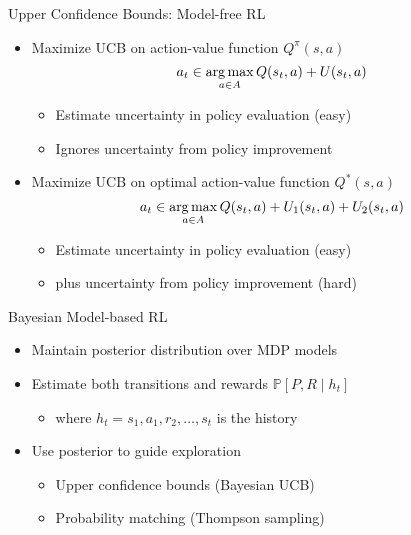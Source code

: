 \documentclass[aspectratio=169]{../latex_main/tntbeamer}  %
\begin{document}
\begin{frame}[c]{Upper Confidence Bounds: Model-free RL}
	
	\begin{itemize}
		\item Maximize UCB on action-value function $Q^\pi(s,a)$
		$$a_t \in \operatorname*{arg\,max}_{a \in A} Q(s_t, a) + U(s_t, a) $$
		
		\begin{itemize}
			\item Estimate uncertainty in policy evaluation (easy)
			\item Ignores uncertainty from policy improvement
		\end{itemize}
		\item Maximize UCB on optimal action-value function $Q^*(s,a)$
		$$a_t \in \operatorname*{arg\,max}_{a \in A} Q(s_t, a) + U_1(s_t, a) + U_2(s_t, a)$$
		\begin{itemize}
			\item Estimate uncertainty in policy evaluation (easy)
			\item plus uncertainty from policy improvement (hard)
		\end{itemize}
		
	\end{itemize}
	
\end{frame}
\begin{frame}[c]{Bayesian Model-based RL}
	
	\begin{itemize}
		\item Maintain posterior distribution over MDP models
		\item Estimate both transitions and rewards $ \mathbb{P}[P, R \mid h_t]$
		\begin{itemize}
			\item where $h_t = s_1, a_1, r_2, \ldots, s_t$ is the history
		\end{itemize}
		\item Use posterior to guide exploration
		\begin{itemize}
			\item Upper confidence bounds (Bayesian UCB)
			\item Probability matching (Thompson sampling)
		\end{itemize}
		
	\end{itemize}
	
\end{frame}
\end{document}
